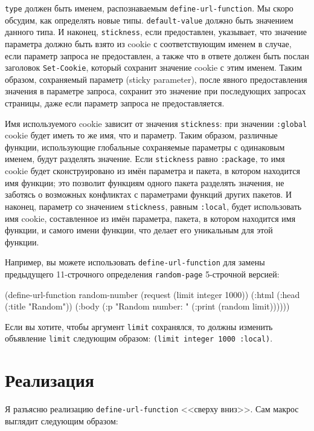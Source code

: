 \lstinline{type} должен быть именем, распознаваемым \lstinline{define-url-function}. Мы скоро
обсудим, как определять новые типы. \lstinline{default-value} должно быть значением данного
типа. И наконец, \lstinline{stickness}, если предоставлен, указывает, что значение параметра
должно быть взято из cookie с соответствующим именем в случае, если параметр запроса не
предоставлен, а также что в ответе должен быть послан заголовок \lstinline{Set-Cookie}, который
сохранит значение cookie с этим именем. Таким образом, сохраняемый параметр (sticky
parameter), после явного предоставления значения в параметре запроса, сохранит это
значение при последующих запросах страницы, даже если параметр запроса не предоставляется.

Имя используемого cookie зависит от значения \lstinline{stickness}: при значении \lstinline{:global}
cookie будет иметь то же имя, что и параметр. Таким образом, различные функции,
использующие глобальные сохраняемые параметры с одинаковым именем, будут разделять
значение. Если \lstinline{stickness} равно \lstinline{:package}, то имя cookie будет сконструировано
из имён параметра и пакета, в котором находится имя функции; это позволит функциям одного
пакета разделять значения, не заботясь о возможных конфликтах с параметрами функций других
пакетов. И наконец, параметр со значением \lstinline{stickness}, равным \lstinline{:local}, будет
использовать имя cookie, составленное из имён параметра, пакета, в котором находится имя
функции, и самого имени функции, что делает его уникальным для этой функции.

Например, вы можете использовать \lstinline{define-url-function} для замены предыдущего
11-строчного определения \lstinline{random-page} 5-строчной версией:

\begin{myverb}
  (define-url-function random-number (request (limit integer 1000))
    (:html
      (:head (:title "Random"))
      (:body
        (:p "Random number: " (:print (random limit))))))
\end{myverb}

Если вы хотите, чтобы аргумент \lstinline{limit} сохранялся, то должны изменить объявление
\lstinline{limit} следующим образом: \lstinline{(limit integer 1000 :local)}.

\section{Реализация}

Я разъясню реализацию \lstinline{define-url-function} <<сверху вниз>>. Сам макрос выглядит
следующим образом:


